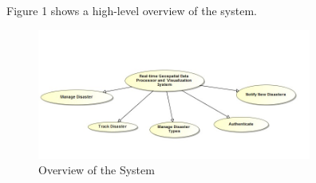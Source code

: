Figure 1 shows a high-level overview of the system.
\begin{figure}[ht!]
\centering
\includegraphics[width=90mm]{../images/system_overview.jpg}
\caption{ Overview of the System \label{overflow}}
\end{figure}